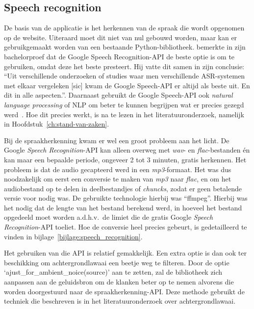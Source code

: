 \subsection{Speech recognition}
De basis van de applicatie is het herkennen van de spraak die wordt opgenomen op de website. Uiteraard moet dit niet van nul gebouwd worden, maar kan er gebruikgemaakt worden van een bestaande Python-bibliotheek. \textcite{Standaert2021} bemerkte in zijn bachelorproef dat  de Google Speech Recognition-API de beste optie is om te gebruiken, omdat deze het beste presteert. Hij vatte dit samen in zijn conclusie: ``Uit verschillende onderzoeken of studies waar men verschillende ASR-systemen met elkaar vergeleken [sic] kwam de Google Speech-API er altijd als beste uit. En dit in alle aspecten.''. Daarnaast gebruikt de Google Speech-API ook \textit{natural language processing} of NLP om beter te kunnen begrijpen wat er precies gezegd werd~\autocite{GoogleCloud2022}. Hoe dit precies werkt, is na te lezen in het literatuuronderzoek, namelijk in Hoofdstuk~\ref{ch:stand-van-zaken}.

Bij de spraakherkenning kwam er wel een groot probleem aan het licht. De Google \textit{Speech Recognition}-API kan alleen overweg met \textit{wav}- en \textit{flac}-bestanden én kan maar een bepaalde periode, ongeveer 2 tot 3 minuten, gratis herkennen. Het probleem is dat de audio gecapteerd werd in een \textit{mp3}-formaat. Het was dus noodzakelijk om eerst een conversie te maken van \textit{mp3} naar \textit{flac}, en om het audiobestand op te delen in deelbestandjes of \textit{chuncks}, zodat er geen betalende versie voor nodig was. De gebruikte technologie hierbij was ``ffmpeg''. Hierbij was het nodig dat de lengte van het bestand berekend werd, in hoeveel  het bestand opgedeeld moet worden a.d.h.v.\ de limiet die de gratis Google \textit{Speech Recognition}-API toeliet. Hoe de conversie heel precies gebeurt, is gedetailleerd te vinden in bijlage~\ref{bijlage:speech_recognition}.

Het gebruiken van die API is relatief gemakkelijk. Een extra optie is dan ook ter beschikking om achtergrondlawaai een beetje weg te filteren. Door de optie \newline`ajust\_for\_ambient\_noice(source)' aan te zetten, zal de bibliotheek zich aanpassen aan de geluidsbron om de klanken beter op te nemen alvorens die worden doorgestuurd naar de spraakherkenning-API. Deze methode gebruikt de techniek die beschreven is in het literatuuronderzoek over achtergrondlawaai.


